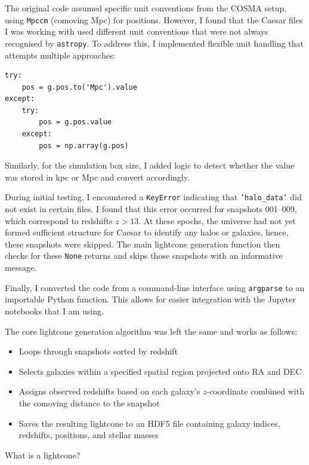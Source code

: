 \documentclass[a4paper, 11pt, oneside]{researchjournal} %
\begin{document}
The original code assumed specific unit conventions from the COSMA setup, using \texttt{Mpccm} (comoving Mpc) for positions. However, I found that the Caesar files I was working with used different unit conventions that were not always recognised by \texttt{astropy}. To address this, I implemented flexible unit handling that attempts multiple approaches:

\begin{verbatim}
try:
    pos = g.pos.to('Mpc').value
except:
    try:
        pos = g.pos.value
    except:
        pos = np.array(g.pos)
\end{verbatim}

Similarly, for the simulation box size, I added logic to detect whether the value was stored in kpc or Mpc and convert accordingly.

During initial testing, I encountered a \texttt{KeyError} indicating that \texttt{'halo\_data'} did not exist in certain files. I found that this error occurred for snapshots 001--009, which correspond to redshifts $z > 13$. At these epochs, the universe had not yet formed sufficient structure for Caesar to identify any halos or galaxies, hence, these snapshots were skipped. The main lightcone generation function then checks for these \texttt{None} returns and skips those snapshots with an informative message.

Finally, I converted the code from a command-line interface using \texttt{argparse} to an importable Python function. This allows for easier integration with the Jupyter notebooks that I am using.

The core lightcone generation algorithm was left the same and works as follows:

\begin{itemize}
\setlength\itemsep{0.5em}
    \item Loops through snapshots sorted by redshift
    \item Selects galaxies within a specified spatial region projected onto RA and DEC
    \item Assigns observed redshifts based on each galaxy's $z$-coordinate combined with the comoving distance to the snapshot
    \item Saves the resulting lightcone to an HDF5 file containing galaxy indices, redshifts, positions, and stellar masses
\end{itemize}


What is a lightcone?
\end{document}
